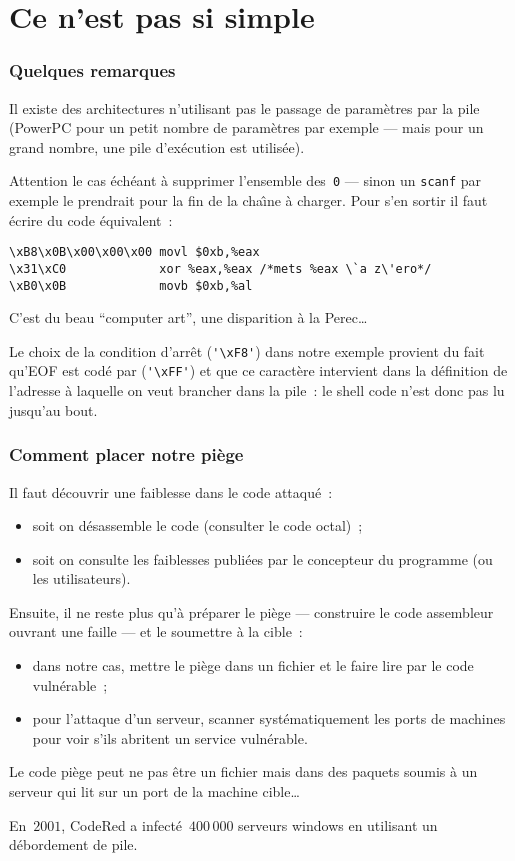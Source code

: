 \section{Ce n'est pas si simple}
\begin{frame}[fragile]
  \frametitle{Quelques remarques}%
  Il existe des architectures n'utilisant pas le passage de
  param\`etres par la pile (PowerPC pour un petit nombre de
  param\`etres par exemple --- mais pour un grand nombre, une pile
  d'ex\'ecution est utilis\'ee).
  \par\medskip
  Attention le cas \'ech\'eant \`a supprimer l'ensemble des~\texttt{0} %
  --- sinon un \texttt{scanf} par exemple le prendrait pour la fin de
  la cha\^\i{}ne \`a charger. Pour s'en sortir il faut \'ecrire du
  code \'equivalent~:
\begin{verbatim}
\xB8\x0B\x00\x00\x00 movl $0xb,%eax 
\x31\xC0             xor %eax,%eax /*mets %eax \`a z\'ero*/
\xB0\x0B             movb $0xb,%al
\end{verbatim}
\par
C'est du beau ``computer art'', une disparition \`a la Perec\ldots 
\par
Le choix de la condition d'arr\^et (\verb?'\xF8'?) dans notre exemple
provient du fait qu'EOF est cod\'e par (\verb?'\xFF'?) et que ce
caract\`ere intervient dans la d\'efinition de l'adresse \`a laquelle
on veut brancher dans la pile~: le shell code n'est donc pas lu
jusqu'au bout.
\end{frame}
\begin{frame}
  \frametitle{Comment placer notre pi\`ege}%
  Il faut d\'ecouvrir une faiblesse dans le code attaqu\'e~:
  \begin{itemize}
  \item soit on d\'esassemble le code (consulter le code octal)~;
  \item soit on consulte les faiblesses publi\'ees par le concepteur
    du programme (ou les utilisateurs).
  \end{itemize}
  Ensuite,    il ne  reste  plus    qu'\`a  pr\'eparer  le pi\`ege ---
  construire le code assembleur ouvrant une faille --- et le soumettre
  \`a la cible~:
  \begin{itemize}
  \item dans notre cas, mettre le pi\`ege  dans un fichier et le faire
    lire par le code vuln\'erable~;
  \item  pour  l'attaque d'un serveur, scanner  syst\'ematiquement les
    ports  de  machines   pour   voir   s'ils  abritent  un    service
    vuln\'erable.
  \end{itemize}
  Le code pi\`ege peut ne pas \^etre un fichier mais dans des paquets
  soumis \`a un serveur qui lit sur un port de la machine cible\ldots
  \par
  En~$2001$, CodeRed a infect\'e~$400\, 000$ serveurs windows en
  utilisant un d\'ebordement de pile.
\end{frame}
